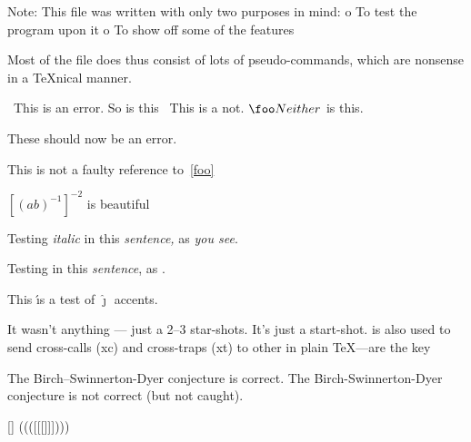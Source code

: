 Note: This file was written with only two purposes in mind:
    o To test the program upon it
    o To show off some of the features

Most of the file does thus consist of lots of pseudo-commands, which
are nonsense in a TeXnical manner.



\foo\ This is an error.
So is this \foo\
\smallskip This is a not. $\foo Neither$ is this.

\startsection[title={Testing ConTeXt}]
These should now be an error.
\stopsection


This is not a faulty reference to~\ref{foo}


${{[{(ab)}^{-1}]}}^{-2}$ is beautiful


Testing {\it italic\/} in this {\em sentence,} as {\em you see}.


Testing \textem{italic} in this \textit{sentence}, as \textem{you see}.


This \'{\i}s a test of $\hat{\jmath}$ accents.


It wasn't anything --- just a 2--3 star-shots.
It's just a start-shot.
is also used to send cross-calls (xc) and cross-traps (xt) to other
in plain TeX---are the key

The Birch--Swinnerton-Dyer conjecture is correct.
The Birch-Swinnerton-Dyer conjecture is not correct (but not caught). %



{[]} ((([[[{{{}}}]]])))


